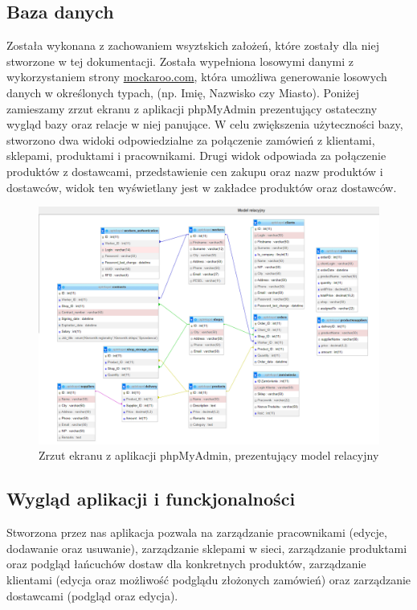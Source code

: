 \documentclass[12pt,a4paper]{article}
\begin{document}
        \subsection{Baza danych}
            Została wykonana z zachowaniem wsyztskich założeń, które zostały dla niej stworzone w tej dokumentacji. Została wypełniona losowymi danymi z wykorzystaniem strony \href{https://www.mockaroo.com/}{mockaroo.com}, która umożliwa generowanie losowych danych w określonych typach, (np. Imię, Nazwisko czy Miasto). Poniżej zamieszamy zrzut ekranu z aplikacji phpMyAdmin prezentujący ostateczny wygląd bazy oraz relacje w niej panujące. W celu zwiększenia użyteczności bazy, stworzono dwa widoki odpowiedzialne za połączenie zamówień z klientami, sklepami, produktami i pracownikami. Drugi widok odpowiada za połączenie produktów z dostawcami, przedstawienie cen zakupu oraz nazw produktów i dostawców, widok ten wyświetlany jest w zakładce produktów oraz dostawców. 
            
            \begin{figure}[H]
                \centering
                \includegraphics[scale=0.4]{images/phpmyadmin.png}
                \caption{Zrzut ekranu z aplikacji phpMyAdmin, prezentujący model relacyjny}
            \end{figure}
            
        \subsection{Wygląd aplikacji i funckjonalności}
            Stworzona przez nas aplikacja pozwala na zarządzanie pracownikami (edycje, dodawanie oraz usuwanie), zarządzanie sklepami w sieci, zarządzanie produktami oraz podgląd łańcuchów dostaw dla konkretnych produktów, zarządzanie klientami (edycja oraz możliwość podglądu złożonych zamówień) oraz zarządzanie dostawcami (podgląd oraz edycja).
            
\end{document}
